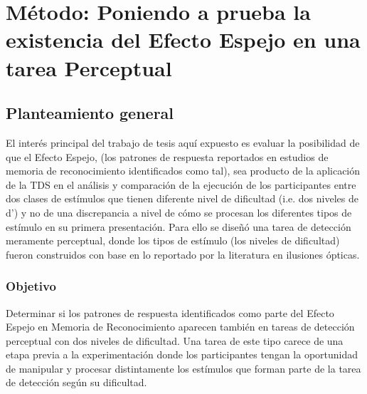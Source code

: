 
\chapter{Método: Poniendo a prueba la existencia del Efecto Espejo en una tarea Perceptual} %

\label{Cap_Exp} %

\section{Planteamiento general}



El interés principal del trabajo de tesis aquí expuesto es evaluar la posibilidad de que el Efecto Espejo, (los patrones de respuesta reportados en estudios de memoria de reconocimiento identificados como tal), sea producto de la aplicación de la TDS  en el análisis y comparación de la ejecución de los participantes entre dos clases de estímulos que tienen diferente nivel de dificultad (i.e. dos niveles de d') y no de una discrepancia a nivel de cómo se procesan los diferentes tipos de estímulo en su primera presentación. Para ello se diseñó una tarea de detección meramente perceptual, donde los tipos de estímulo (los niveles de dificultad) fueron construidos con base en lo reportado por la literatura en ilusiones ópticas.\\ 



\subsection{Objetivo}

Determinar si los patrones de respuesta identificados como parte del Efecto Espejo en Memoria de Reconocimiento aparecen también en tareas de detección perceptual con dos niveles de dificultad. Una tarea de este tipo carece de una etapa previa a la experimentación donde los participantes tengan la oportunidad de manipular y procesar distintamente los estímulos que forman parte de la tarea de detección según su dificultad.\\

